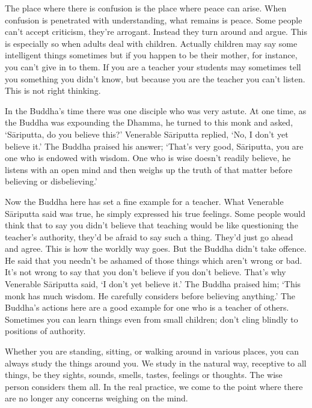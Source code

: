 The place where there is confusion is the place where peace can arise. When confusion is penetrated with understanding, what remains is peace. Some people can't accept criticism, they're arrogant. Instead they turn around and argue. This is especially so when adults deal with children. Actually children may say some intelligent things sometimes but if you happen to be their mother, for instance, you can't give in to them. If you are a teacher your students may sometimes tell you something you didn't know, but because you are the teacher you can't listen. This is not right thinking.

In the Buddha's time there was one disciple who was very astute. At one time, as the Buddha was expounding the Dhamma, he turned to this monk and asked, `S\=ariputta, do you believe this?' Venerable S\=ariputta replied, `No, I don't yet believe it.' The Buddha praised his answer; `That's very good, S\=ariputta, you are one who is endowed with wisdom. One who is wise doesn't readily believe, he listens with an open mind and then weighs up the truth of that matter before believing or disbelieving.'

Now the Buddha here has set a fine example for a teacher. What Venerable S\=ariputta said was true, he simply expressed his true feelings. Some people would think that to say you didn't believe that teaching would be like questioning the teacher's authority, they'd be afraid to say such a thing. They'd just go ahead and agree. This is how the worldly way goes. But the Buddha didn't take offence. He said that you needn't be ashamed of those things which aren't wrong or bad. It's not wrong to say that you don't believe if you don't believe. That's why Venerable S\=ariputta said, `I don't yet believe it.' The Buddha praised him; `This monk has much wisdom. He carefully considers before believing anything.' The Buddha's actions here are a good example for one who is a teacher of others. Sometimes you can learn things even from small children; don't cling blindly to positions of authority.

Whether you are standing, sitting, or walking around in various places, you can always study the things around you. We study in the natural way, receptive to all things, be they sights, sounds, smells, tastes, feelings or thoughts. The wise person considers them all. In the real practice, we come to the point where there are no longer any concerns weighing on the mind.

